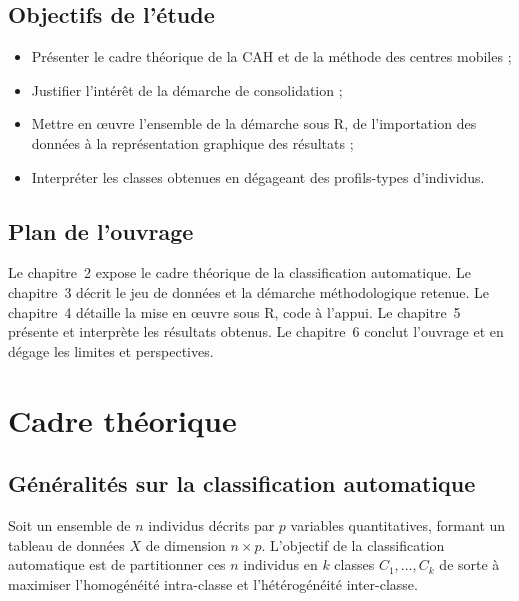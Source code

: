 \documentclass[11pt,a4paper,oneside]{book}
\begin{document}
\section*{Objectifs de l'étude}
\begin{itemize}
  \item Présenter le cadre théorique de la CAH et de la méthode des centres mobiles ;
  \item Justifier l'intérêt de la démarche de consolidation ;
  \item Mettre en \oe uvre l'ensemble de la démarche sous R, de l'importation des données à la représentation graphique des résultats ;
  \item Interpréter les classes obtenues en dégageant des profils-types d'individus.
\end{itemize}

\section*{Plan de l'ouvrage}
Le chapitre~2 expose le cadre théorique de la classification automatique. Le chapitre~3 décrit le jeu de données et la démarche méthodologique retenue. Le chapitre~4 détaille la mise en \oe uvre sous R, code à l'appui. Le chapitre~5 présente et interprète les résultats obtenus. Le chapitre~6 conclut l'ouvrage et en dégage les limites et perspectives.

\chapter{Cadre théorique}

\section{Généralités sur la classification automatique}

Soit un ensemble de $n$ individus décrits par $p$ variables quantitatives, formant un tableau de données $X$ de dimension $n \times p$. L'objectif de la classification automatique est de partitionner ces $n$ individus en $k$ classes $C_1, \dots, C_k$ de sorte à maximiser l'homogénéité intra-classe et l'hétérogénéité inter-classe.
\end{document}
